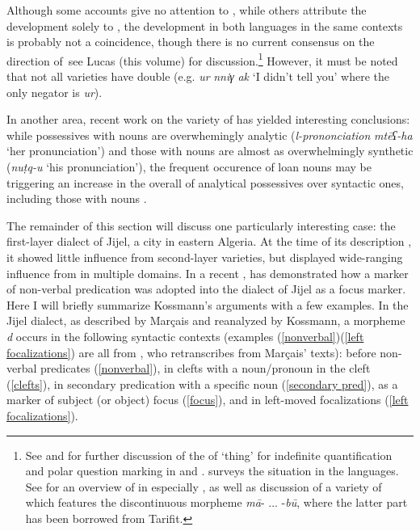 \documentclass[output=paper]{langsci/langscibook}
\begin{document}
Although some accounts give no attention to , while others attribute the  development solely to , the development in both languages in the same contexts is probably not a coincidence, though there is no current consensus on the direction of  \textendash \,see Lucas (this volume) for discussion.\footnote{See \citet{Lucas2007,Lucas2010,Lucas2018} and \citet{Souag2018thing} for further discussion of the  of `thing’ for indefinite quantification and polar question marking in  and . \citet[324–334]{Kossmann2013book} surveys the situation in the  languages. See \citet{Lafkioui2013reinventing} for an overview of  in especially  , as well as discussion of a variety of   which features the discontinuous morpheme \textit{mā}{}- ... -\textit{bū}, where the latter part has been borrowed from Tarifit.} However, it must be noted that not all  varieties have double  (e.g.  \textit{ur} \textit{nniγ} \textit{ak} ‘I didn’t tell you’ where the only negator is \textit{ur}).

  In another area, recent work on the variety of  has yielded interesting conclusions: while possessives with  nouns are overwhemingly analytic (\textit{l-prononciation} \textit{mtēʕ-ha} ‘her pronunciation’) and those with  nouns are almost as overwhelmingly synthetic (\textit{nuṭq-u} ‘his pronunciation’), the frequent occurence of  loan nouns may be triggering an increase in the overall  of analytical possessives over syntactic ones, including those with  nouns \citep{Sayahi2015}.

  The remainder of this section will discuss one particularly interesting case: the first-layer dialect of Jijel, a city in eastern Algeria. At the time of its description \citep{Marçais1956}, it showed little influence from second-layer varieties, but displayed wide-ranging influence from  in multiple domains. In a recent , \citet{Kossmann2014} has demonstrated how a  marker of non-verbal predication was adopted into the  dialect of Jijel as a focus marker. Here I will briefly summarize Kossmann’s arguments with a few examples. In the Jijel dialect, as described by Marçais and reanalyzed by Kossmann, a morpheme \textit{d} occurs in the following syntactic contexts (examples (\ref{nonverbal})\textendash(\ref{left focalizations}) are all from \citealt[129]{Kossmann2014}, who retranscribes from Marçais’ texts): before non-verbal predicates (\ref{nonverbal}), in clefts with a noun/pronoun in the cleft (\ref{clefts}), in secondary predication with a specific noun (\ref{secondary pred}), as a marker of subject (or object) focus (\ref{focus}), and in left-moved focalizations (\ref{left focalizations}).
\end{document}
